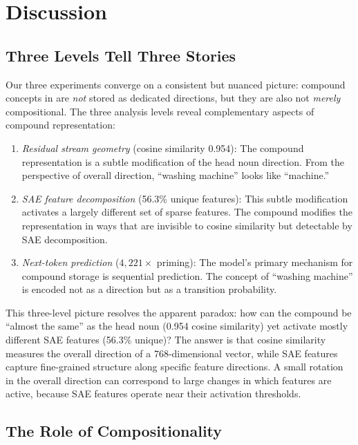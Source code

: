\section{Discussion}
\label{sec:discussion}

\subsection{Three Levels Tell Three Stories}

Our three experiments converge on a consistent but nuanced picture: compound concepts in \gpttwo are \emph{not} stored as dedicated directions, but they are also not \emph{merely} compositional.
The three analysis levels reveal complementary aspects of compound representation:

\begin{enumerate}[leftmargin=*,itemsep=0pt,topsep=0pt]
    \item \emph{Residual stream geometry} (cosine similarity 0.954): The compound representation is a subtle modification of the head noun direction. From the perspective of overall direction, ``washing machine'' looks like ``machine.''
    \item \emph{SAE feature decomposition} (56.3\% unique features): This subtle modification activates a largely different set of sparse features. The compound modifies the representation in ways that are invisible to cosine similarity but detectable by SAE decomposition.
    \item \emph{Next-token prediction} ($4{,}221\times$ priming): The model's primary mechanism for compound storage is sequential prediction. The concept of ``washing machine'' is encoded not as a direction but as a transition probability.
\end{enumerate}

This three-level picture resolves the apparent paradox: how can the compound be ``almost the same'' as the head noun (0.954 cosine similarity) yet activate mostly different SAE features (56.3\% unique)?
The answer is that cosine similarity measures the overall direction of a 768-dimensional vector, while SAE features capture fine-grained structure along specific feature directions.
A small rotation in the overall direction can correspond to large changes in which features are active, because SAE features operate near their activation thresholds.

\subsection{The Role of Compositionality}

